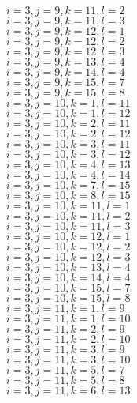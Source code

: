 \documentclass[14pt]{article}
\begin{document}
    $i=3,j=9,k=11,l=2 $ \\ 
    $i=3,j=9,k=11,l=3 $ \\ 
    $i=3,j=9,k=12,l=1 $ \\ 
    $i=3,j=9,k=12,l=2 $ \\ 
    $i=3,j=9,k=12,l=3 $ \\ 
    $i=3,j=9,k=13,l=4 $ \\ 
    $i=3,j=9,k=14,l=4 $ \\ 
    $i=3,j=9,k=15,l=7 $ \\ 
    $i=3,j=9,k=15,l=8 $ \\ 
    $i=3,j=10,k=1,l=11 $ \\ 
    $i=3,j=10,k=1,l=12 $ \\ 
    $i=3,j=10,k=2,l=11 $ \\ 
    $i=3,j=10,k=2,l=12 $ \\ 
    $i=3,j=10,k=3,l=11 $ \\ 
    $i=3,j=10,k=3,l=12 $ \\ 
    $i=3,j=10,k=4,l=13 $ \\ 
    $i=3,j=10,k=4,l=14 $ \\ 
    $i=3,j=10,k=7,l=15 $ \\ 
    $i=3,j=10,k=8,l=15 $ \\ 
    $i=3,j=10,k=11,l=1 $ \\ 
    $i=3,j=10,k=11,l=2 $ \\ 
    $i=3,j=10,k=11,l=3 $ \\ 
    $i=3,j=10,k=12,l=1 $ \\ 
    $i=3,j=10,k=12,l=2 $ \\ 
    $i=3,j=10,k=12,l=3 $ \\ 
    $i=3,j=10,k=13,l=4 $ \\ 
    $i=3,j=10,k=14,l=4 $ \\ 
    $i=3,j=10,k=15,l=7 $ \\ 
    $i=3,j=10,k=15,l=8 $ \\ 
    $i=3,j=11,k=1,l=9 $ \\ 
    $i=3,j=11,k=1,l=10 $ \\ 
    $i=3,j=11,k=2,l=9 $ \\ 
    $i=3,j=11,k=2,l=10 $ \\ 
    $i=3,j=11,k=3,l=9 $ \\ 
    $i=3,j=11,k=3,l=10 $ \\ 
    $i=3,j=11,k=5,l=7 $ \\ 
    $i=3,j=11,k=5,l=8 $ \\ 
    $i=3,j=11,k=6,l=13 $ \\ 
\end{document}
